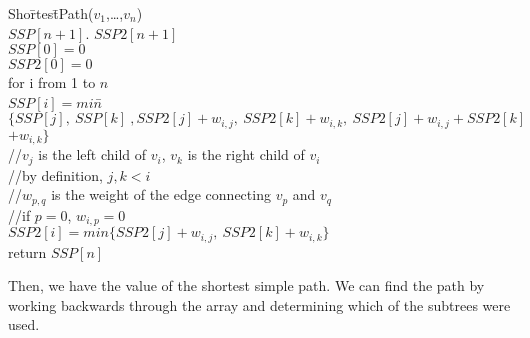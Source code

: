 \documentclass{article}
\begin{document}
\begin{enumerate}
\begin{tabbing}
Sho\= rtes\= tPath($v_1$,\ldots ,$v_n$)\\
\>$SSP[n+1]$. $SSP2[n+1]$\\
\>$SSP[0] = 0$\\
\>$SSP2[0] = 0$\\
\>for i from 1 to $n$\\
\>\>$SSP[i]= min$\= $\{SSP[j],\ SSP[k]\ ,SSP2[j]+w_{i,j},\ SSP2[k]+w_{i,k},\ SSP2[j]+w_{i,j}+SSP2[k]$\\
\>\>\>$ + w_{i,k}\}$\\
\>\>\>//$v_j$ is the left child of $v_i$, $v_k$ is the right child of $v_i$\\
\>\>\>//by definition, $j,k<i$\\
\>\>\>//$w_{p,q}$ is the weight of the edge connecting $v_p$ and $v_q$\\
\>\>\>//if $p=0$, $w_{i,p}=0$\\
\>\>$SSP2[i]=min\{SSP2[j]+w_{i,j},\ SSP2[k]+w_{i,k}\}$\\
\>return $SSP[n]$
\end{tabbing}
Then, we have the value of the shortest simple path. We can find the path by working backwards through the array and determining which of the subtrees were used.
\end{enumerate}
\end{document}

